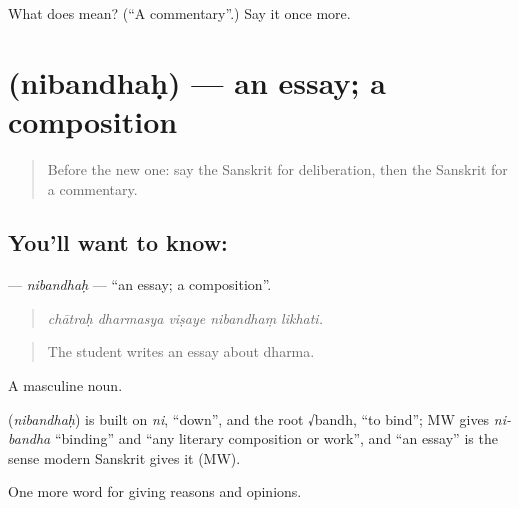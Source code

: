 \begin{tcolorbox}[breakable,colback=teal!4,colframe=teal!35!black,title={Before you move on}]
What does  mean? (\textquotedblleft{}A commentary\textquotedblright{}.) Say it once more.
\end{tcolorbox}
\section[\texorpdfstring{\sk{निबन्धः} (nibandhaḥ)}{निबन्धः (nibandhaḥ)}]{ (nibandhaḥ) — an essay; a composition}

\label{lesson:SA-C364-nibandhah}



\begin{quote}
Before the new one: say the Sanskrit for deliberation, then the Sanskrit for a commentary.
\end{quote}

\subsection*{You'll want to know: }
\textbf{} — \emph{nibandhaḥ} — \textquotedblleft{}an essay; a composition\textquotedblright{}.

\begin{quote}
    
\end{quote}

\begin{quote}
\emph{chātraḥ dharmasya viṣaye nibandhaṃ likhati.}
\end{quote}

\begin{quote}
The student writes an essay about dharma.
\end{quote}

A masculine noun.

\begin{cousinweb}
\textbf{} (\emph{nibandhaḥ}) is built on \emph{ni}, \textquotedblleft{}down\textquotedblright{}, and the root √bandh, \textquotedblleft{}to bind\textquotedblright{}; MW gives \emph{ni-bandha} \textquotedblleft{}binding\textquotedblright{} and \textquotedblleft{}any literary composition or work\textquotedblright{}, and \textquotedblleft{}an essay\textquotedblright{} is the sense modern Sanskrit gives it (MW).
\end{cousinweb}

\begin{grammarlens}[title={What you've built}]
One more word for giving reasons and opinions.
\end{grammarlens}

